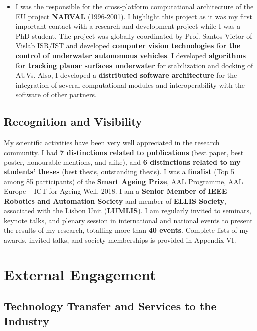 \documentclass[
]{article}
\begin{document}
\begin{itemize}
  as part of the RBCog lab, which has been used to support the
  graduation of many PhD students. It created a community of users and
  spin-off projects that paved the way for the growth of research in the
  \textbf{humanoid robotics} field.
\item
  I was the responsible for the cross-platform computational
  architecture of the EU project \textbf{NARVAL} (1996-2001). I
  highlight this project as it was my first important contact with a
  research and development project while I was a PhD student. The
  project was globally coordinated by Prof. Santos-Victor of Vislab
  ISR/IST and developed \textbf{computer vision technologies for the
  control of underwater autonomous vehicles}. I developed
  \textbf{algorithms for tracking planar surfaces underwater} for
  stabilization and docking of AUVs. Also, I developed a
  \textbf{distributed software architecture} for the integration of
  several computational modules and interoperability with the software
  of other partners.
\end{itemize}

\subsection{Recognition and
Visibility}\label{recognition-and-visibility}

My scientific activities have been very well appreciated in the research
community. I had \textbf{7 distinctions related to publications} (best
paper, best poster, honourable mentions, and alike), and \textbf{6
distinctions related to my students' theses} (best thesis, outstanding
thesis). I was a \textbf{finalist} (Top 5 among 85 participants) of the
\textbf{Smart Ageing Prize}, AAL Programme, AAL Europe -- ICT for Ageing
Well, 2018. I am a \textbf{Senior Member of IEEE Robotics and Automation
Society} and member of \textbf{ELLIS Society}, associated with the
Lisbon Unit (\textbf{LUMLIS}). I am regularly invited to seminars,
keynote talks, and plenary session in international and national events
to present the results of my research, totalling more than \textbf{40
events}. Complete lists of my awards, invited talks, and society
memberships is provided in Appendix VI.

\section{External Engagement}\label{external-engagement}

\subsection{Technology Transfer and Services to the
Industry}\label{technology-transfer-and-services-to-the-industry}
\end{document}
